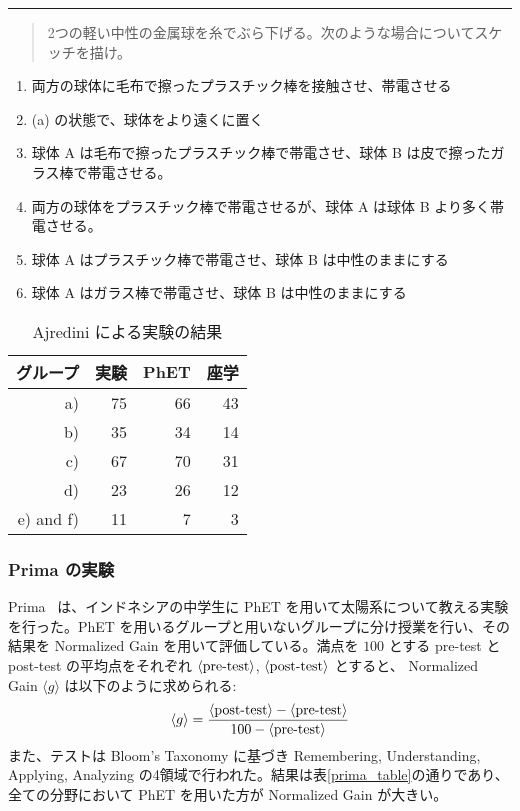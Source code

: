 \begin{table}[htb]
\noindent\rule{\linewidth}{0.4pt}
\begin{quote}
2つの軽い中性の金属球を糸でぶら下げる。次のような場合についてスケッチを描け。
\end{quote}
\begin{enumerate}
\renewcommand{\labelenumi}{\alph{enumi}).}
\item 両方の球体に毛布で擦ったプラスチック棒を接触させ、帯電させる
\item (a) の状態で、球体をより遠くに置く
\item 球体 A は毛布で擦ったプラスチック棒で帯電させ、球体 B は皮で擦ったガラス棒で帯電させる。
\item 両方の球体をプラスチック棒で帯電させるが、球体 A は球体 B より多く帯電させる。
\item 球体 A はプラスチック棒で帯電させ、球体 B は中性のままにする
\item 球体 A はガラス棒で帯電させ、球体 B は中性のままにする
\end{enumerate}
\centering
\begin{tabular}{rrrr}
  \toprule
  グループ & 実験 & PhET & 座学 \\
  \midrule
  a) & 75 & 66 & 43 \\
  b) & 35 & 34 & 14 \\
  c) & 67 & 70 & 31 \\
  d) & 23 & 26 & 12 \\
  e) and f) & 11 & 7 & 3 \\
  \bottomrule
\end{tabular}
\caption{Ajredini による実験の結果} \label{ajredini_result}
\end{table}

\subsubsection{Prima の実験}

Prima~\cite{prima_learning_2018} は、インドネシアの中学生に PhET を用いて太陽系について教える実験を行った。PhET を用いるグループと用いないグループに分け授業を行い、その結果を Normalized Gain を用いて評価している。満点を $100$ とする pre-test と post-test の平均点をそれぞれ $\langle \textrm{pre\\-test} \rangle$, $\langle \textrm{post\\-test} \rangle$ とすると、 Normalized Gain $\langle g \rangle$ は以下のように求められる:
$$ \langle g \rangle = \dfrac{\langle \textrm{post\\-test} \rangle - \langle \textrm{pre\\-test} \rangle}{100 - \langle \textrm{pre\\-test} \rangle} $$
また、テストは Bloom's Taxonomy に基づき Remembering, Understanding, Applying, Analyzing の4領域で行われた。結果は表\ref{prima_table}の通りであり、全ての分野において PhET を用いた方が Normalized Gain が大きい。

